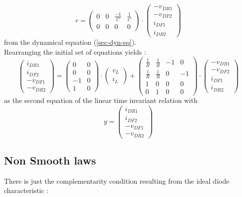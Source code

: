 \documentclass[10pt]{article}
\begin{document}
\[
r =
\left( \begin{array}{cccc}
0 & 0 & \frac{-1}{C} & \frac{1}{C}\\
0 & 0 & 0 & 0
\end{array} \right)
 \cdot 
\left( \begin{array}{c}
-v_{DR1}\\
-v_{DF2}\\
i_{DF1}\\
i_{DR2}
\end{array} \right)
\]
from the dynamical equation (\ref{sec-dyn-eq}).\\
Rearranging the initial set of equations yields :
\[
\left( \begin{array}{c}
i_{DR1}\\
i_{DF2}\\
-v_{DF1}\\
-v_{DR2}
\end{array} \right)
 = 
\left( \begin{array}{cc}
0 & 0\\
0 & 0\\
-1 & 0\\
1 & 0
\end{array} \right)
 \cdot
\left( \begin{array}{c}
v_L\\
i_L
\end{array} \right)
+
\left( \begin{array}{cccc}
\frac{1}{R} & \frac{1}{R} & -1 & 0\\
\frac{1}{R} & \frac{1}{R} & 0 & -1\\
1 & 0 & 0 & 0\\
0 & 1 & 0 & 0
\end{array} \right)
 \cdot
\left( \begin{array}{c}
-v_{DR1}\\
-v_{DF2}\\
i_{DF1}\\
i_{DR2}
\end{array} \right)
\]
as the second equation of the linear time invariant relation with 
\[
y = 
\left( \begin{array}{c}
i_{DR1}\\
i_{DF2}\\
-v_{DF1}\\
-v_{DR2}
\end{array} \right)
\]


\subsection{Non Smooth laws}
\label{Non Smooth laws}
There is just the complementarity condition resulting from the ideal diode characteristic :
\end{document}
